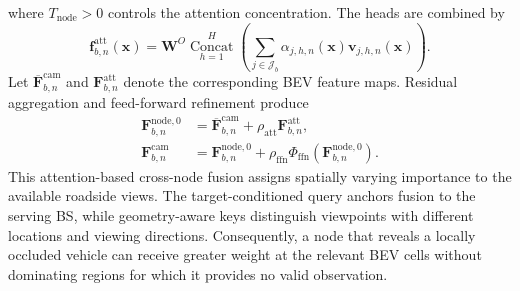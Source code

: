 where \(T_{\mathrm{node}}>0\) controls the attention concentration.  The heads
are combined by
\begin{equation}
    \mathbf{f}^{\mathrm{att}}_{b,n}(\mathbf{x})
    =
    \mathbf{W}^{O}
    \underset{h=1}{\overset{H}{\operatorname{Concat}}}
    \left(
    \sum_{j\in\mathcal{J}_b}
    \alpha_{j,h,n}(\mathbf{x})
    \mathbf{v}_{j,h,n}(\mathbf{x})
    \right).
    \label{eq:method-node-attended-feature}
\end{equation}
Let \(\overline{\mathbf{F}}^{\mathrm{cam}}_{b,n}\) and
\(\mathbf{F}^{\mathrm{att}}_{b,n}\) denote the corresponding BEV feature maps.
Residual aggregation and feed-forward refinement produce
\begin{align}
    \mathbf{F}^{\mathrm{node},0}_{b,n}
    &=\overline{\mathbf{F}}^{\mathrm{cam}}_{b,n}
    +\rho_{\mathrm{att}}\mathbf{F}^{\mathrm{att}}_{b,n},\\
    \mathbf{F}^{\mathrm{cam}}_{b,n}
    &=\mathbf{F}^{\mathrm{node},0}_{b,n}
    +\rho_{\mathrm{ffn}}
    \Phi_{\mathrm{ffn}}\!\left(\mathbf{F}^{\mathrm{node},0}_{b,n}\right).
    \label{eq:method-node-aggregation}
\end{align}
This attention-based cross-node fusion assigns spatially varying importance to
the available roadside views.  The target-conditioned query anchors fusion to
the serving BS, while geometry-aware keys distinguish viewpoints with different
locations and viewing directions.  Consequently, a node that reveals a locally
occluded vehicle can receive greater weight at the relevant BEV cells without
dominating regions for which it provides no valid observation.

